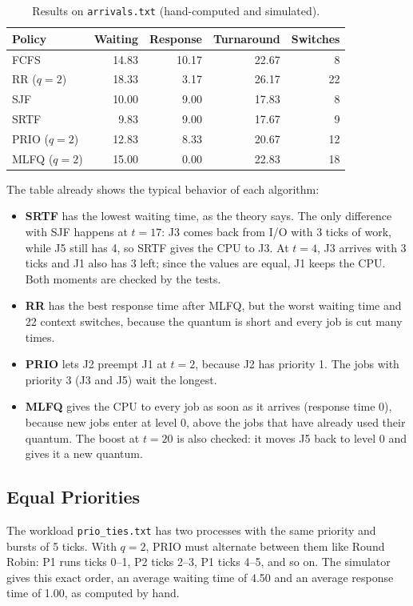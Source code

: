 \begin{table}[H]
\centering
\caption{Results on \texttt{arrivals.txt} (hand-computed and simulated).}
\label{tab:arrivals}
\begin{tabular}{lrrrr}
\toprule
Policy & Waiting & Response & Turnaround & Switches \\
\midrule
FCFS & 14.83 & 10.17 & 22.67 & 8 \\
RR ($q=2$) & 18.33 & 3.17 & 26.17 & 22 \\
SJF & 10.00 & 9.00 & 17.83 & 8 \\
SRTF & 9.83 & 9.00 & 17.67 & 9 \\
PRIO ($q=2$) & 12.83 & 8.33 & 20.67 & 12 \\
MLFQ ($q=2$) & 15.00 & 0.00 & 22.83 & 18 \\
\bottomrule
\end{tabular}
\end{table}

The table already shows the typical behavior of each algorithm:
\begin{itemize}
    \item \textbf{SRTF} has the lowest waiting time, as the theory says. The only difference with SJF happens at $t=17$: J3 comes back from I/O with 3 ticks of work, while J5 still has 4, so SRTF gives the CPU to J3. At $t=4$, J3 arrives with 3 ticks and J1 also has 3 left; since the values are equal, J1 keeps the CPU. Both moments are checked by the tests.
    \item \textbf{RR} has the best response time after MLFQ, but the worst waiting time and 22 context switches, because the quantum is short and every job is cut many times.
    \item \textbf{PRIO} lets J2 preempt J1 at $t=2$, because J2 has priority 1. The jobs with priority 3 (J3 and J5) wait the longest.
    \item \textbf{MLFQ} gives the CPU to every job as soon as it arrives (response time 0), because new jobs enter at level 0, above the jobs that have already used their quantum. The boost at $t=20$ is also checked: it moves J5 back to level 0 and gives it a new quantum.
\end{itemize}

\subsection{Equal Priorities}
The workload \texttt{prio\_ties.txt} has two processes with the same priority and bursts of 5 ticks. With $q=2$, PRIO must alternate between them like Round Robin: P1 runs ticks 0--1, P2 ticks 2--3, P1 ticks 4--5, and so on. The simulator gives this exact order, an average waiting time of 4.50 and an average response time of 1.00, as computed by hand.

